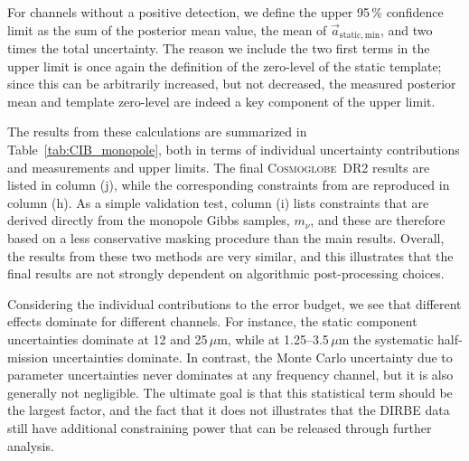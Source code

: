 \documentclass{aa}
\renewcommand{\a}[0]{\vec{a}}
\newcommand{\cosmoglobe}{\textsc{Cosmoglobe}}
\begin{document}
For channels without a positive detection, we define the upper 95\,\%
confidence limit as the sum of the posterior mean value, the mean of
$\a_{\mathrm{static,min}}$, and two times the total uncertainty. The
reason we include the two first terms in the upper limit is once again
the definition of the zero-level of the static template; since this
can be arbitrarily increased, but not decreased, the measured
posterior mean and template zero-level are indeed a key component of
the upper limit.


The results from these calculations are summarized in
Table~\ref{tab:CIB_monopole}, both in terms of individual uncertainty
contributions and measurements and upper limits. The final
\cosmoglobe\ DR2 results are listed in column (j), while the
corresponding constraints from \citet{hauser1998} are reproduced in
column (h). As a simple validation test, column (i) lists constraints
that are derived directly from the monopole Gibbs samples, $m_{\nu}$,
and these are therefore based on a less conservative masking procedure
than the main results. Overall, the results from these two methods are
very similar, and this illustrates that the final results are not
strongly dependent on algorithmic post-processing choices.

Considering the individual contributions to the error budget, we see that
different effects dominate for different channels. For instance, the static
component uncertainties dominate at 12 and 25$\,\mu\mathrm{m}$, while at
1.25--3.5$\,\mu\mathrm{m}$ the systematic half-mission uncertainties dominate.
In contrast, the Monte Carlo uncertainty due to parameter uncertainties never
dominates at any frequency channel, but it is also generally not negligible.
The ultimate goal is that this statistical term should be the largest factor,
and the fact that it does not illustrates that the DIRBE data still have
additional constraining power that can be released through further analysis.
\end{document}

